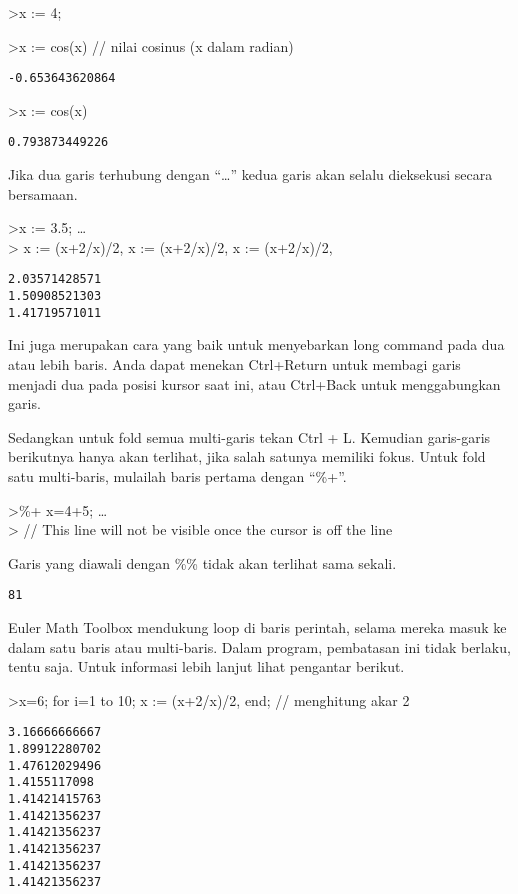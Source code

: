\documentclass[
]{book}
\begin{document}
\textgreater x := 4;

\textgreater x := cos(x) // nilai cosinus (x dalam radian)

\begin{verbatim}
-0.653643620864
\end{verbatim}

\textgreater x := cos(x)

\begin{verbatim}
0.793873449226
\end{verbatim}

Jika dua garis terhubung dengan ``\ldots{}'' kedua garis akan selalu dieksekusi secara bersamaan.

\textgreater x := 3.5; \ldots{}\\
\textgreater{} x := (x+2/x)/2, x := (x+2/x)/2, x := (x+2/x)/2,

\begin{verbatim}
2.03571428571
1.50908521303
1.41719571011
\end{verbatim}

Ini juga merupakan cara yang baik untuk menyebarkan long command pada dua atau lebih baris. Anda dapat menekan Ctrl+Return untuk membagi garis menjadi dua pada posisi kursor saat ini, atau Ctrl+Back untuk menggabungkan garis.

Sedangkan untuk fold semua multi-garis tekan Ctrl + L. Kemudian garis-garis berikutnya hanya akan terlihat, jika salah satunya memiliki fokus. Untuk fold satu multi-baris, mulailah baris pertama dengan ``\%+''.

\textgreater\%+ x=4+5; \ldots{}\\
\textgreater{} // This line will not be visible once the cursor is off the line

Garis yang diawali dengan \%\% tidak akan terlihat sama sekali.

\begin{verbatim}
81
\end{verbatim}

Euler Math Toolbox mendukung loop di baris perintah, selama mereka masuk ke dalam satu baris atau multi-baris. Dalam program, pembatasan ini tidak berlaku, tentu saja. Untuk informasi lebih lanjut lihat pengantar berikut.

\textgreater x=6; for i=1 to 10; x := (x+2/x)/2, end; // menghitung akar 2

\begin{verbatim}
3.16666666667
1.89912280702
1.47612029496
1.4155117098
1.41421415763
1.41421356237
1.41421356237
1.41421356237
1.41421356237
1.41421356237
\end{verbatim}
\end{document}
